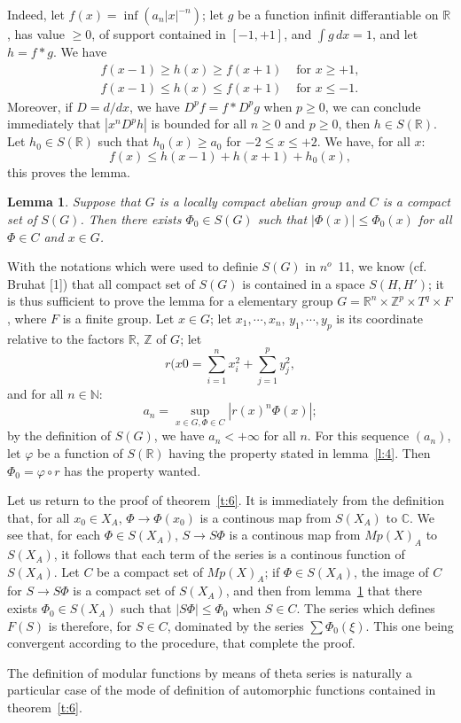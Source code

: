 \documentclass[12pt]{amsart}
\newtheorem{lemma}{Lemma}
\def\bR{{\mathbb{R}}}
\def\bN{{\mathbb{N}}}
\def\bZ{{\mathbb{Z}}}
\def\bC{{\mathbb{C}}}
\def\abs#1{\left|{#1}\right|}
\begin{document}
Indeed, let $f(x) = \inf(a_n|x|^{-n})$; let $g$ be a function infinit 
differantiable on $\bR$, has value $\geq 0$, of support contained in $[-1,+1]$,
and $\int g\, dx = 1$, and let $h = f*g$. 
We have
\begin{align*}
f(x-1) \geq h(x)\geq f(x+1)  &\text{ for } x\geq +1,\\
f(x-1) \leq h(x) \leq f(x+1) &\text{ for } x\leq -1.
\end{align*}
Moreover, if $D=d/dx$, we have $D^pf = f*D^pg$ when $p\geq 0$, 
we can conclude immediately that $|x^nD^ph|$ is bounded for all $n\geq 0$
and $p\geq 0$, then $h\in S(\bR)$.
Let $h_0\in S(\bR)$ such that $h_0(x)\geq a_0$ for $-2\leq x\leq +2$. 
We have, for all $x$:
\[
f(x)\leq h(x-1)+h(x+1)+h_0(x),
\] 
this proves the lemma.

\begin{lemma}\label{l:5}
Suppose that $G$ is a locally compact abelian group and 
$C$ is a compact set of $S(G)$. Then there exists $\Phi_0\in S(G)$
such that $|\Phi(x)|\leq \Phi_0(x)$ for all $\Phi\in C$ and $x\in G$. 
\end{lemma}

With the notations which were used to definie $S(G)$ in $n^o$~11,
we know (cf. Bruhat [1]) that all compact set of $S(G)$ is contained in 
a space $S(H, H')$; it is thus sufficient to prove the lemma for a elementary
group $G=\bR^n\times \bZ^p\times T^q\times F$, where $F$ is a finite group. 
Let $x\in G$; let $x_1, \cdots, x_n$, $y_1, \cdots, y_p$ is its coordinate 
relative to the factors $\bR$, $\bZ$ of $G$; let 
\[
r(x0 = \sum_{i=1}^n x_i^2 + \sum_{j=1}^p y_j^2,
\]
and for all $n\in \bN$:
\[
a_n = \sup_{x\in G, \Phi\in C} \abs{r(x)^n\Phi(x)};
\]
by the definition of $S(G)$, we have $a_n < +\infty$ for all $n$. 
For this sequence $(a_n)$, let $\varphi$ be a function of $S(\bR)$
having the property stated in lemma~\ref{l:4}. Then $\Phi_0 = \varphi\circ r$
has the property wanted.

Let us return to the proof of theorem~\ref{t:6}. It is immediately from the 
definition that, for all $x_0\in X_A$, $\Phi\to \Phi(x_0)$ 
is a continous map from $S(X_A)$ to $\bC$. 
We see that, for each $\Phi\in S(X_A)$, $S\to S\Phi$ is a continous map
from $Mp(X)_A$ to $S(X_A)$, it follows that each term of the series 
is a continous function of $S(X_A)$. Let $C$ be a compact set of $Mp(X)_A$;
if $\Phi\in S(X_A)$, the image of $C$ for $S\to S\Phi$ is a compact 
set of $S(X_A)$, and then from lemma~\ref{l:5} that there exists 
$\Phi_0\in S(X_A)$ such that $\abs{S\Phi} \leq \Phi_0$ when $S \in C$. 
The series which defines $F(S)$ is 
therefore, for $S\in C$,  dominated by the series $\sum\Phi_0(\xi)$. 
This one being convergent 
according to the procedure, that complete the proof. 

The definition of modular functions by means of theta series 
is naturally a particular case of the 
mode of definition of automorphic functions contained in theorem~\ref{t:6}.
\end{document}
